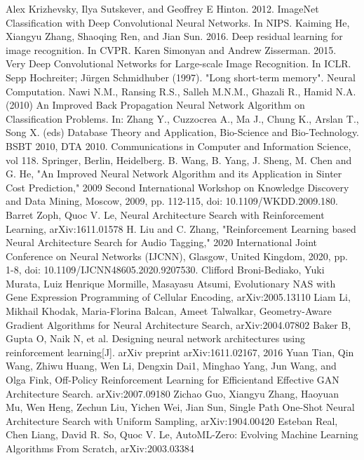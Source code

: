 \documentclass[conference]{IEEEtran}
\begin{document}
% 
\begin{thebibliography}{00}
 Alex Krizhevsky, Ilya Sutskever, and Geoffrey E Hinton. 2012. ImageNet Classification with Deep Convolutional Neural Networks. In NIPS. 
Kaiming He, Xiangyu Zhang, Shaoqing Ren, and Jian Sun. 2016. Deep residual learning for image recognition. In CVPR.
 Karen Simonyan and Andrew Zisserman. 2015. Very Deep Convolutional Networks for Large-scale Image Recognition. In ICLR.
 Sepp Hochreiter; Jürgen Schmidhuber (1997). "Long short-term memory". Neural Computation. 
 Nawi N.M., Ransing R.S., Salleh M.N.M., Ghazali R., Hamid N.A. (2010) An Improved Back Propagation Neural Network Algorithm on Classification Problems. In: Zhang Y., Cuzzocrea A., Ma J., Chung K., Arslan T., Song X. (eds) Database Theory and Application, Bio-Science and Bio-Technology. BSBT 2010, DTA 2010. Communications in Computer and Information Science, vol 118. Springer, Berlin, Heidelberg.
 B. Wang, B. Yang, J. Sheng, M. Chen and G. He, "An Improved Neural Network Algorithm and its Application in Sinter Cost Prediction," 2009 Second International Workshop on Knowledge Discovery and Data Mining, Moscow, 2009, pp. 112-115, doi: 10.1109/WKDD.2009.180.
 Barret Zoph, Quoc V. Le, Neural Architecture Search with Reinforcement Learning, arXiv:1611.01578
 H. Liu and C. Zhang, "Reinforcement Learning based Neural Architecture Search for Audio Tagging," 2020 International Joint Conference on Neural Networks (IJCNN), Glasgow, United Kingdom, 2020, pp. 1-8, doi: 10.1109/IJCNN48605.2020.9207530.
 Clifford Broni-Bediako, Yuki Murata, Luiz Henrique Mormille, Masayasu Atsumi, Evolutionary NAS with Gene Expression Programming of Cellular Encoding, arXiv:2005.13110
 Liam Li, Mikhail Khodak, Maria-Florina Balcan, Ameet Talwalkar, Geometry-Aware Gradient Algorithms for Neural Architecture Search, arXiv:2004.07802
 Baker B, Gupta O, Naik N, et al. Designing neural network architectures using reinforcement learning[J]. arXiv preprint arXiv:1611.02167, 2016
 Yuan Tian, Qin Wang, Zhiwu Huang, Wen Li, Dengxin Dai1, Minghao Yang, Jun Wang, and Olga Fink, Off-Policy Reinforcement Learning for Efficientand Effective GAN Architecture Search. arXiv:2007.09180
 Zichao Guo, Xiangyu Zhang, Haoyuan Mu, Wen Heng, Zechun Liu, Yichen Wei, Jian Sun, Single Path One-Shot Neural Architecture Search with Uniform Sampling, arXiv:1904.00420
 Esteban Real, Chen Liang, David R. So, Quoc V. Le, AutoML-Zero: Evolving Machine Learning Algorithms From Scratch, arXiv:2003.03384


\end{thebibliography}
\end{document}
